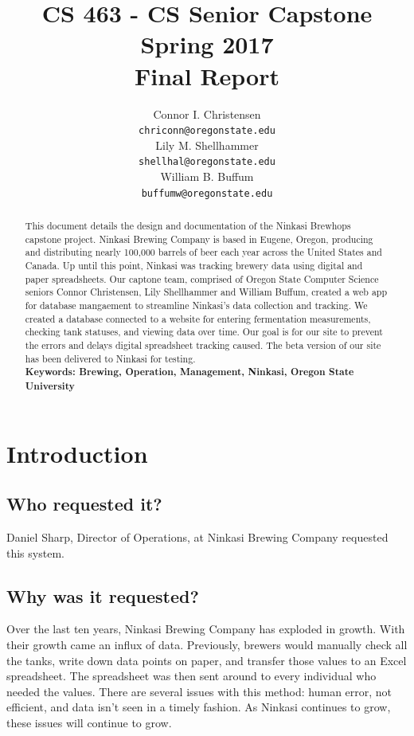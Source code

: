 \documentclass[draftclsnofoot,onecolumn,letterpaper,10pt]{IEEEtran}
\title{CS 463 - CS Senior Capstone
	\\Spring 2017
	\\Final Report
}
\author{
	Connor I. Christensen \\
	\texttt{chriconn@oregonstate.edu}
	\\
	Lily M. Shellhammer \\
	\texttt{shellhal@oregonstate.edu}
	\\
	William B. Buffum \\
	\texttt{buffumw@oregonstate.edu}
}
\begin{document}
\begin{titlingpage}
    \maketitle
    \begin{abstract}
			This document details the design and documentation of the Ninkasi Brewhops capstone project.
			Ninkasi Brewing Company is based in Eugene, Oregon, producing and distributing nearly 100,000 barrels of beer each year across the United States and Canada.
			Up until this point, Ninkasi was tracking brewery data using digital and paper spreadsheets.
			Our captone team, comprised of Oregon State Computer Science seniors Connor Christensen, Lily Shellhammer and William Buffum, created a web app for database mangaement to streamline Ninkasi's data collection and tracking.
			We created a database connected to a website for entering fermentation measurements, checking tank statuses, and viewing data over time.
			Our goal is for our site to prevent the errors and delays digital spreadsheet tracking caused.
			The beta version of our site has been delivered to Ninkasi for testing.
			\\
			\textbf{Keywords: Brewing, Operation, Management, Ninkasi, Oregon State University}
    \end{abstract}
		\pagebreak
		\tableofcontents
\end{titlingpage}

\section{Introduction}
	\subsection{Who requested it?}
	Daniel Sharp, Director of Operations, at Ninkasi Brewing Company requested this system.

	\subsection{Why was it requested?}
	Over the last ten years, Ninkasi Brewing Company has exploded in growth.
	With their growth came an influx of data.
	Previously, brewers would manually check all the tanks, write down data points on paper, and transfer those values to an Excel spreadsheet.
	The spreadsheet was then sent around to every individual who needed the values.
	There are several issues with this method: human error, not efficient, and data isn't seen in a timely fashion.
	As Ninkasi continues to grow, these issues will continue to grow.
\end{document}
